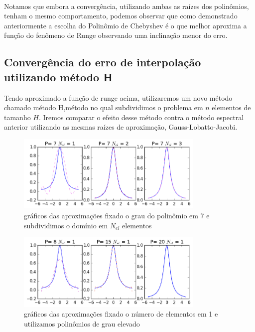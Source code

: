 \\
Notamos que embora a convergência, utilizando ambas as raízes dos polinômios, tenham o mesmo comportamento, podemos observar que como demonstrado  anteriormente a escolha do Polinômio de Chebyshev é o que melhor aproxima a função do fenômeno de Runge observando uma inclinação menor do erro.

\subsection{Convergência do erro de interpolação utilizando método H}
 Tendo aproximado a função de runge acima, utilizaremos um novo método chamado método H,método no qual subdividimos o problema em $n$ elementos de tamanho $H$. Iremos comparar o efeito desse método contra o método espectral anterior utilizando as mesmas raízes de aproximação, Gauss-Lobatto-Jacobi.
 
\begin{figure}[!ht]
  \includegraphics[width=0.8\textwidth,center]{figuras/interp_usando_FEM.png}
  \caption{gráficos das aproximações fixado o grau do polinômio em 7 e subdividimos o domínio em $N_{el}$ elementos }
\end{figure}
\begin{figure}[!hb]
  \includegraphics[width=0.8\textwidth,center]{figuras/interp_usando_FEMfixo.png}
  \caption{gráficos das aproximações fixado o número de elementos em 1 e utilizamos polinômios de grau elevado}
\end{figure}

